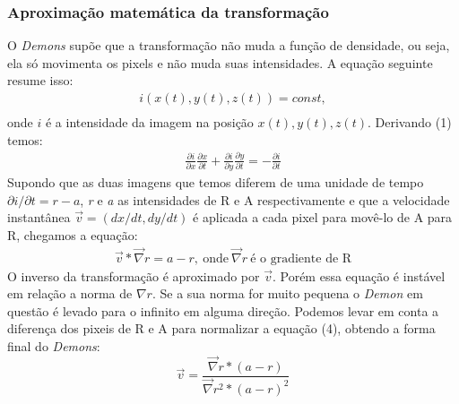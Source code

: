 \subsubsection{Aproximação matemática da transformação}
    O \textit{Demons} supõe que a transformação não muda a função de densidade, ou seja, ela só movimenta os pixels e não muda
suas intensidades. A equação seguinte resume isso:
\begin{align}
    i(x(t),y(t),z(t)) = const, \\
\end{align}
    onde $i$ é a intensidade da imagem na posição $x(t),y(t),z(t)$. Derivando (1) temos:
\begin{align}
    \frac{\partial i}{\partial x} \frac{\partial x}{\partial t} +
    \frac{\partial i}{\partial y} \frac{\partial y}{\partial t} = - \frac{\partial i}{\partial t}
\end{align}
    Supondo que as duas imagens que temos diferem de uma unidade de tempo $\partial i/\partial t =
r-a$, \textit{r} e \textit{a} as intensidades de R e A respectivamente e que a velocidade instantânea
$\vec{v} = (dx/dt,dy/dt)$ é aplicada a cada pixel para movê-lo de A para R, chegamos a equação:
\begin{align}
    \vec{v}*\vec{\nabla}r = a - r, \ \text{onde} \ \vec{\nabla} r \ \text{é o gradiente de R}
\end{align}
    O inverso da transformação é aproximado por $\vec{v}$. Porém essa equação é instável em relação a norma de $\nabla
r$. Se a sua norma for muito pequena o \textit{Demon} em questão é levado para o infinito em alguma direção. Podemos levar em
conta a diferença dos pixeis de R e A para normalizar a equação (4), obtendo a forma final do \textit{Demons}:
\begin{equation}
    \vec{v} = \frac{\vec{\nabla}r * (a - r)}{\vec{\nabla}r^2 * (a - r)^2}
\end{equation}

